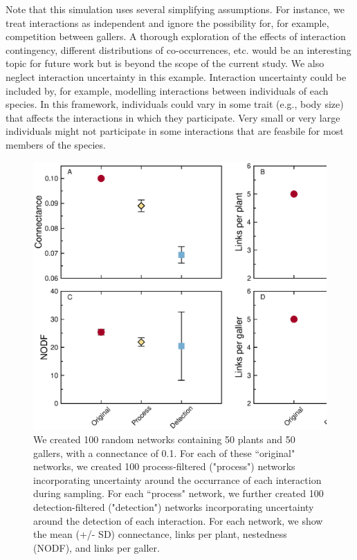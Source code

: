 \documentclass[12pt]{article}
\begin{document}
  Note that this simulation uses several simplifying assumptions. For instance, we treat interactions as independent and ignore the possibility for, for example, competition between gallers. A thorough exploration of the effects of interaction contingency, different distributions of co-occurrences, etc. would be an interesting topic for future work but is beyond the scope of the current study. We also neglect interaction uncertainty in this example. Interaction uncertainty could be included by, for example, modelling interactions between individuals of each species. In this framework, individuals could vary in some trait (e.g., body size) that affects the interactions in which they participate. Very small or very large individuals might not participate in some interactions that are feasbile for most members of the species. 


  \begin{figure}
  \label{sim_props}
  \caption{We created 100 random networks containing 50 plants and 50 gallers, with a connectance of 0.1. For each of these ``original" networks, we created 100 process-filtered ("process") networks incorporating uncertainty around the occurrance of each interaction during sampling. For each ``process" network, we further created 100 detection-filtered ("detection") networks incorporating uncertainty around the detection of each interaction. For each network, we show the mean (+/- SD) connectance, links per plant, nestedness (NODF), and links per galler.}
  \begin{center}
  \includegraphics*[width=\textwidth]{figures/simulation_example.eps}
  \end{center}
  \end{figure}
\end{document}
